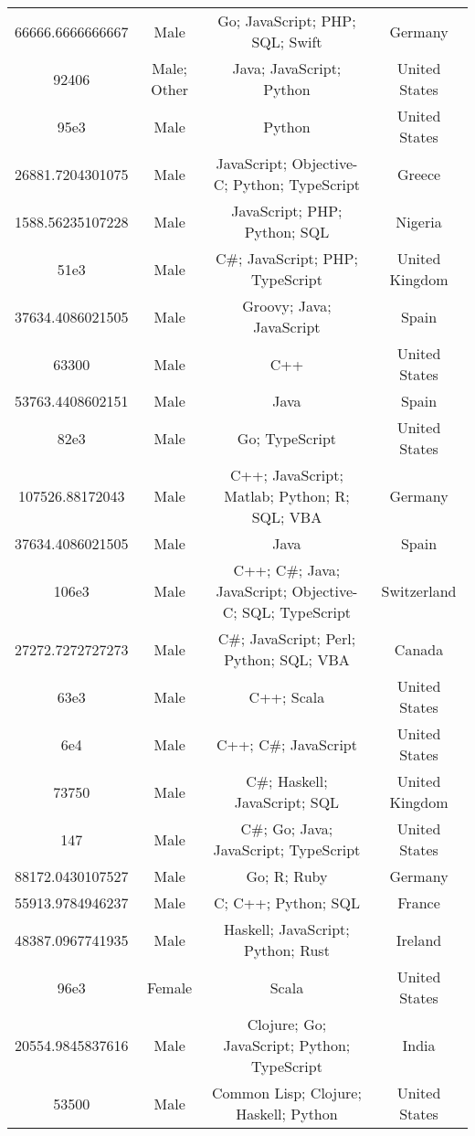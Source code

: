 \begin{center}
\begin{tabular}{ |c|c|c|c| }
66666.6666666667  &  Male  &  Go; JavaScript; PHP; SQL; Swift  &  Germany  \\ 
92406  &  Male; Other  &  Java; JavaScript; Python  &  United States  \\ 
95e3  &  Male  &  Python  &  United States  \\ 
26881.7204301075  &  Male  &  JavaScript; Objective-C; Python; TypeScript  &  Greece  \\ 
1588.56235107228  &  Male  &  JavaScript; PHP; Python; SQL  &  Nigeria  \\ 
51e3  &  Male  &  C\#; JavaScript; PHP; TypeScript  &  United Kingdom  \\ 
37634.4086021505  &  Male  &  Groovy; Java; JavaScript  &  Spain  \\ 
63300  &  Male  &  C++  &  United States  \\ 
53763.4408602151  &  Male  &  Java  &  Spain  \\ 
82e3  &  Male  &  Go; TypeScript  &  United States  \\ 
107526.88172043  &  Male  &  C++; JavaScript; Matlab; Python; R; SQL; VBA  &  Germany  \\ 
37634.4086021505  &  Male  &  Java  &  Spain  \\ 
106e3  &  Male  &  C++; C\#; Java; JavaScript; Objective-C; SQL; TypeScript  &  Switzerland  \\ 
27272.7272727273  &  Male  &  C\#; JavaScript; Perl; Python; SQL; VBA  &  Canada  \\ 
63e3  &  Male  &  C++; Scala  &  United States  \\ 
6e4  &  Male  &  C++; C\#; JavaScript  &  United States  \\ 
73750  &  Male  &  C\#; Haskell; JavaScript; SQL  &  United Kingdom  \\ 
147  &  Male  &  C\#; Go; Java; JavaScript; TypeScript  &  United States  \\ 
88172.0430107527  &  Male  &  Go; R; Ruby  &  Germany  \\ 
55913.9784946237  &  Male  &  C; C++; Python; SQL  &  France  \\ 
48387.0967741935  &  Male  &  Haskell; JavaScript; Python; Rust  &  Ireland  \\ 
96e3  &  Female  &  Scala  &  United States  \\ 
20554.9845837616  &  Male  &  Clojure; Go; JavaScript; Python; TypeScript  &  India  \\ 
53500  &  Male  &  Common Lisp; Clojure; Haskell; Python  &  United States  \\ 

\end{tabular}
\end{center}
